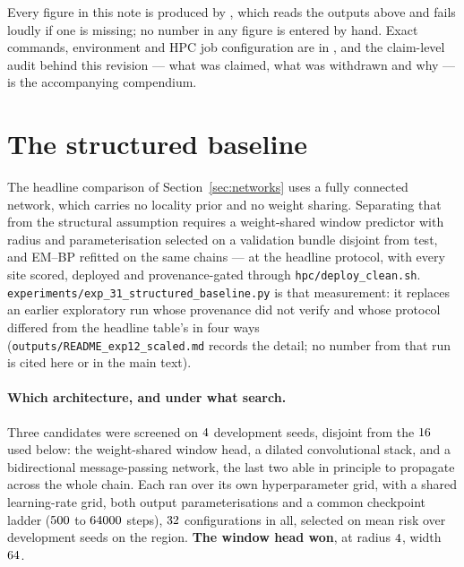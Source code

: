 Every figure in this note is produced by
, which reads the outputs above and fails
loudly if one is missing; no number in any figure is entered by hand. Exact commands, environment
and HPC job configuration are in , and the claim-level audit behind
this revision --- what was claimed, what was withdrawn and why --- is the accompanying compendium.

\section{The structured baseline}
\label{app:structured}

The headline comparison of Section~\ref{sec:networks} uses a fully connected network, which
carries no locality prior and no weight sharing. Separating that from the structural assumption
requires a weight-shared window predictor with radius and parameterisation selected on a
validation bundle disjoint from test, and EM--BP refitted on the same chains --- at the headline
protocol, with every site scored, deployed and provenance-gated through
\texttt{hpc/deploy\_clean.sh}. \texttt{experiments/exp\_31\_structured\_baseline.py} is that
measurement: it replaces an earlier exploratory run whose provenance did not verify and whose
protocol differed from the headline table's in four ways (\texttt{outputs/README\_exp12\_scaled.md}
records the detail; no number from that run is cited here or in the main text).

\paragraph{Which architecture, and under what search.} Three candidates were screened on
$4$ development seeds, disjoint from the $16$ used below: the
weight-shared window head, a dilated convolutional stack, and a bidirectional message-passing
network, the last two able in principle to propagate across the whole chain. Each ran over its own
hyperparameter grid, with a shared learning-rate grid, both output parameterisations and a common
checkpoint ladder ($500$ to $64000$ steps), $32$ configurations in
all, selected on mean risk over development seeds on the \screenregion{} region. \textbf{The window
head won}, at radius $4$, width $64$.



